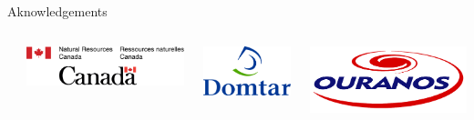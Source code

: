 \documentclass[10pt,aspectratio=149]{beamer}
\begin{document}
\begin{frame}[t]{Aknowledgements}
\begin{center}
\begin{columns}[t]
\begin{column}{0.19\linewidth}
	\end{column}
	\begin{column}{0.22\linewidth}
		\includegraphics[width=0.21\paperwidth]{Figs/logo/logo_14_CAN.png}	
	\end{column}
	\begin{column}{0.17\linewidth}
		\includegraphics[width=0.12\paperwidth]{Figs/logo/logo_7_domtar.png}	
	\end{column}
	\begin{column}{0.17\linewidth}
		\includegraphics[width=0.13\paperwidth]{Figs/logo/logo_9_ouranos.png}
	\end{column}
\end{columns}
\end{center}
\end{frame}

\end{document}

